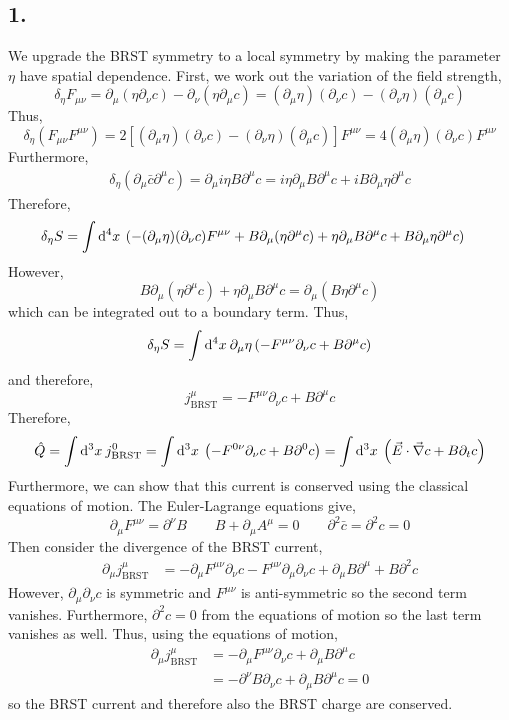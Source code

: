\documentclass[12pt]{article}
\begin{document}
\subsection*{1.}

We upgrade the BRST symmetry to a local symmetry by making the parameter $\eta$ have spatial dependence. First, we work out the variation of the field strength,
\[ \delta_\eta F_{\mu \nu} = \partial_\mu (\eta \partial_\nu c) - \partial_\nu (\eta \partial_\mu c) = (\partial_\mu \eta) (\partial_\nu c) - (\partial_\nu \eta) (\partial_\mu c) \]
Thus,
\[ \delta_{\eta} (F_{\mu \nu} F^{\mu \nu}) = 2 [(\partial_\mu \eta) (\partial_\nu c) - (\partial_\nu \eta) (\partial_\mu c)] F^{\mu\nu} = 4 (\partial_\mu \eta) (\partial_\nu c) F^{\mu \nu} \]
Furthermore,
\begin{align*}
\delta_{\eta} \left( \partial_\mu \bar{c} \partial^\mu c \right) = \partial_\mu i \eta B \partial^\mu c = i \eta \partial_\mu B \partial^\mu c + i B \partial_\mu \eta \partial^\mu c 
\end{align*}
Therefore,
\begin{align*}
\delta_{\eta} S & = \int \mathrm{d}^{4} x \: \left( - (\partial_\mu \eta) (\partial_\nu c) F^{\mu \nu} + B \partial_\mu (\eta \partial^\mu c) + \eta \partial_\mu B \partial^\mu c + B \partial_\mu \eta \partial^\mu c \right)
\end{align*}
However, 
\[ B \partial_\mu (\eta \partial^\mu c) + \eta \partial_\mu B \partial^\mu c = \partial_\mu (B \eta \partial^\mu c) \]
which can be integrated out to a boundary term. 
Thus,
\[ \delta_{\eta} S = \int \mathrm{d}^{4} x \: \partial_\mu \eta \left( - F^{\mu \nu} \partial_\nu c + B \partial^\mu c \right) \]
and therefore,
\[ j^\mu_{\text{BRST}} = -F^{\mu \nu} \partial_\nu c + B \partial^\mu c \]
Therefore,
\[ \hat{Q} = \int \mathrm{d}^{3} x \: j^0_{\text{BRST}} = \int \mathrm{d}^{3} x \: \left( -F^{0 \nu} \partial_\nu c + B \partial^0 c \right) = \int \mathrm{d}^{3} x \: \left( \vec{E} \cdot \vec{\nabla} c + B \partial_t c \right) \]
Furthermore, we can show that this current is conserved using the classical equations of motion. The Euler-Lagrange equations give,
\[ \partial_\mu F^{\mu \nu} = \partial^\nu B \quad \quad B + \partial_\mu A^\mu = 0 \quad \quad \partial^2 \bar{c} = \partial^2 c = 0 \]
Then consider the divergence of the BRST current,
\begin{align*}
\partial_\mu j^\mu_{\text{BRST}} & = - \partial_\mu F^{\mu \nu} \partial_\nu c - F^{\mu \nu} \partial_\mu \partial_\nu c + \partial_\mu B \partial^\mu + B \partial^2 c
\end{align*}
However, $\partial_\mu \partial_\nu c$ is symmetric and $F^{\mu \nu}$ is anti-symmetric so the second term vanishes. Furthermore, $\partial^2 c = 0$ from the equations of motion so the last term vanishes as well. Thus, using the equations of motion,
\begin{align*}
\partial_\mu j^\mu_{\text{BRST}} & = - \partial_\mu F^{\mu \nu} \partial_\nu c + \partial_\mu B \partial^\mu c
\\
& = - \partial^\nu B \partial_\nu c + \partial_\mu B \partial^\mu c = 0
\end{align*}
so the BRST current and therefore also the BRST charge are conserved.
\end{document}
